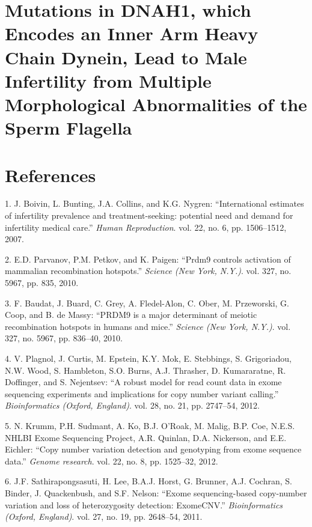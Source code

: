 \documentclass[12pt,twoside]{ugathesis}
\begin{document}
\chapter{Mutations in DNAH1, which Encodes an Inner Arm Heavy Chain
Dynein, Lead to Male Infertility from Multiple Morphological
Abnormalities of the Sperm Flagella}\label{dnah12014}

\chapter*{References}\label{references}

\hypertarget{refs}{}
\hypertarget{ref-Boivin2007a}{}
1. J. Boivin, L. Bunting, J.A. Collins, and K.G. Nygren: ``International
estimates of infertility prevalence and treatment-seeking: potential
need and demand for infertility medical care.'' \emph{Human
Reproduction}. vol. 22, no. 6, pp. 1506--1512, 2007.

\hypertarget{ref-Parvanov2010}{}
2. E.D. Parvanov, P.M. Petkov, and K. Paigen: ``Prdm9 controls
activation of mammalian recombination hotspots.'' \emph{Science (New
York, N.Y.)}. vol. 327, no. 5967, pp. 835, 2010.

\hypertarget{ref-Baudat2010}{}
3. F. Baudat, J. Buard, C. Grey, A. Fledel-Alon, C. Ober, M. Przeworski,
G. Coop, and B. de Massy: ``PRDM9 is a major determinant of meiotic
recombination hotspots in humans and mice.'' \emph{Science (New York,
N.Y.)}. vol. 327, no. 5967, pp. 836--40, 2010.

\hypertarget{ref-Plagnol2012}{}
4. V. Plagnol, J. Curtis, M. Epstein, K.Y. Mok, E. Stebbings, S.
Grigoriadou, N.W. Wood, S. Hambleton, S.O. Burns, A.J. Thrasher, D.
Kumararatne, R. Doffinger, and S. Nejentsev: ``A robust model for read
count data in exome sequencing experiments and implications for copy
number variant calling.'' \emph{Bioinformatics (Oxford, England)}. vol.
28, no. 21, pp. 2747--54, 2012.

\hypertarget{ref-Krumm2012}{}
5. N. Krumm, P.H. Sudmant, A. Ko, B.J. O'Roak, M. Malig, B.P. Coe,
N.E.S. NHLBI Exome Sequencing Project, A.R. Quinlan, D.A. Nickerson, and
E.E. Eichler: ``Copy number variation detection and genotyping from
exome sequence data.'' \emph{Genome research}. vol. 22, no. 8, pp.
1525--32, 2012.

\hypertarget{ref-Sathirapongsasuti2011}{}
6. J.F. Sathirapongsasuti, H. Lee, B.A.J. Horst, G. Brunner, A.J.
Cochran, S. Binder, J. Quackenbush, and S.F. Nelson: ``Exome
sequencing-based copy-number variation and loss of heterozygosity
detection: ExomeCNV.'' \emph{Bioinformatics (Oxford, England)}. vol. 27,
no. 19, pp. 2648--54, 2011.
\end{document}

